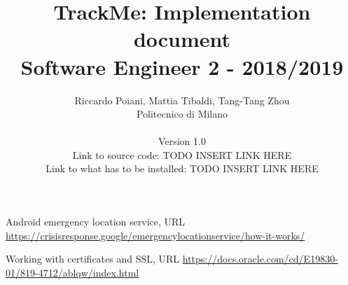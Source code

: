 \documentclass[a4paper]{article}
\begin{document}
\title{TrackMe: Implementation document \\Software Engineer 2 - 2018/2019}
\author{
        Riccardo Poiani, Mattia Tibaldi, Tang-Tang Zhou \\
        Politecnico di Milano\\\\ 
        Version 1.0 \\
        Link to source code: TODO INSERT LINK HERE \\
	    Link to what has to be installed: TODO INSERT LINK HERE \\
}
\maketitle
\newpage
\tableofcontents
\newpage













\newpage

\begin{thebibliography}{9}

Android emergency location service, URL \url{https://crisisresponse.google/emergencylocationservice/how-it-works/}

Working with certificates and SSL, URL \url{https://docs.oracle.com/cd/E19830-01/819-4712/ablqw/index.html}

\end{thebibliography}
\end{document}

